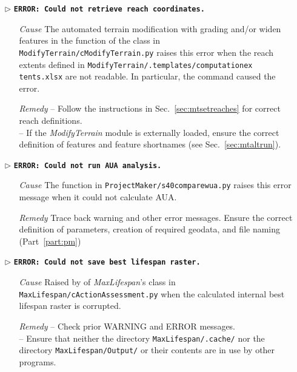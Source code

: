\begin{itemize}
	\item[$\triangleright$]\textbf{\texttt{ERROR: Could not retrieve reach coordinates.}}
	\begin{itemize}
		\item[\textit{Cause}\hspace{0.27cm}] The automated terrain modification with grading and/or widen features in the  function of the  class in \texttt{ModifyTerrain/cModifyTerrain.py} raises this error when the reach extents defined in \texttt{ModifyTerrain/.templates/computation{\myUnderscore}ex tents.xlsx} are not readable. In particular, the command  caused the error.
		\item[\textit{Remedy}] -- Follow the instructions in Sec.~\ref{sec:mtsetreaches} for correct reach definitions.\\
								-- If the \textit{ModifyTerrain} module is externally loaded, ensure the correct definition of features and feature shortnames (see Sec.~\ref{sec:mtaltrun}).\\
	\end{itemize}
	
	\item[$\triangleright$]\textbf{\texttt{ERROR: Could not run AUA analysis.}}
	\begin{itemize}
		\item[\textit{Cause}\hspace{0.27cm}] The  function in \texttt{ProjectMaker/s40{\myUnderscore}compare{\myUnderscore}wua.py} raises this error message when it could not calculate AUA.
		\item[\textit{Remedy}] Trace back warning and other error messages. Ensure the correct definition of parameters, creation of required geodata, and file naming (Part~\ref{part:pm})\\
	\end{itemize}
	
	\item[$\triangleright$]\textbf{\texttt{ERROR: Could not save best lifespan raster.}}
	\begin{itemize}
		\item[\textit{Cause}\hspace{0.27cm}] Raised by  of \textit{MaxLifespan}'s  class in \texttt{MaxLifespan/cActionAssessment.py} when the calculated internal best lifespan raster is corrupted.
		\item[\textit{Remedy}] -- Check prior WARNING and ERROR messages.\\
								-- Ensure that neither the directory \texttt{MaxLifespan/.cache/} nor the directory \texttt{MaxLifespan/Output/} or their contents are in use by other programs.\\
	\end{itemize}
	

\end{itemize}
